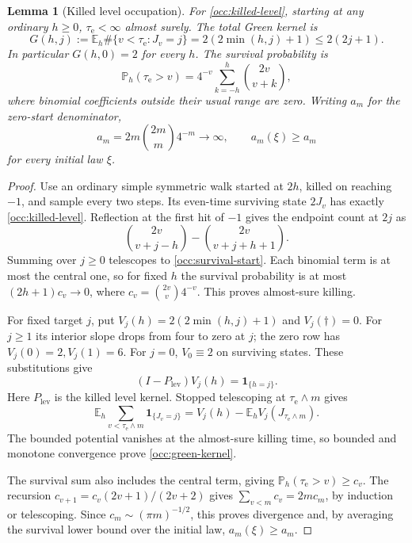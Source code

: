 \documentclass[11pt]{amsart}
\newtheorem{lemma}[theorem]{Lemma}
\theoremstyle{definition}
\theoremstyle{remark}
\newcommand{\E}{\mathbb E}
\newcommand{\PP}{\mathbb P}
\newcommand{\one}{\mathbf 1}
\begin{document}
\begin{lemma}[Killed level occupation]\label{occ:green}
For \eqref{occ:killed-level}, starting at any ordinary $h\ge0$,
$\tau_{\mathrm e}<\infty$ almost surely.  The total Green kernel is
\begin{equation}
 G(h,j):=\E_h\#\{v<\tau_{\mathrm e}:J_v=j\}
       =2(2\min(h,j)+1)\le2(2j+1).
 \label{occ:green-kernel}
\end{equation}
In particular $G(h,0)=2$ for every $h$.  The survival probability is
\begin{equation}
 \PP_h(\tau_{\mathrm e}>v)=4^{-v}
       \sum_{k=-h}^{h}\binom{2v}{v+k},
 \label{occ:survival-start}
\end{equation}
where binomial coefficients outside their usual range are zero.
Writing $a_m$ for the zero-start denominator,
\begin{equation}
 a_m=2m\binom{2m}{m}4^{-m}\longrightarrow\infty,\qquad
 a_m(\xi)\ge a_m
 \label{occ:normalizer}
\end{equation}
for every initial law $\xi$.
\end{lemma}
\begin{proof}
Use an ordinary simple symmetric walk started at $2h$, killed on reaching
$-1$, and sample every two steps.  Its even-time surviving state $2J_v$
has exactly \eqref{occ:killed-level}.  Reflection at the first hit of
$-1$ gives the endpoint count at $2j$ as
\[
 \binom{2v}{v+j-h}-\binom{2v}{v+j+h+1}.
\]
Summing over $j\ge0$ telescopes to \eqref{occ:survival-start}.
Each binomial term is at most the central one, so for fixed $h$ the
survival probability is at most $(2h+1)c_v\to0$, where
$c_v=\binom{2v}{v}4^{-v}$.  This proves almost-sure killing.

For fixed target $j$, put $V_j(h)=2(2\min(h,j)+1)$ and
$V_j(\dagger)=0$.  For $j\ge1$ its interior slope drops from four to
zero at $j$; the zero row has $V_j(0)=2,V_j(1)=6$.
For $j=0$, $V_0\equiv2$ on surviving states.  These substitutions give
\[
 (I-P_{\mathrm{lev}})V_j(h)=\one_{\{h=j\}}.
\]
Here $P_{\mathrm{lev}}$ is the killed level kernel.  Stopped telescoping
at $\tau_{\mathrm e}\wedge m$ gives
\[
 \E_h\sum_{v<\tau_{\mathrm e}\wedge m}\one_{\{J_v=j\}}
 =V_j(h)-\E_h V_j(J_{\tau_{\mathrm e}\wedge m}).
\]
The bounded potential vanishes at the almost-sure killing time, so
bounded and monotone convergence prove \eqref{occ:green-kernel}.

The survival sum also includes the central term, giving
$\PP_h(\tau_{\mathrm e}>v)\ge c_v$.  The recursion
$c_{v+1}=c_v(2v+1)/(2v+2)$ gives
$\sum_{v<m}c_v=2mc_m$, by induction or telescoping.
Since $c_m\sim(\pi m)^{-1/2}$, this proves divergence and, by averaging
the survival lower bound over the initial law, $a_m(\xi)\ge a_m$.
\end{proof}
\end{document}
